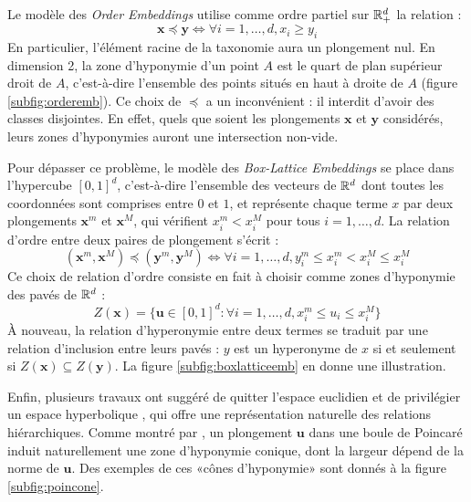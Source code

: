 Le modèle des \textit{Order Embeddings}\cite{vendrov2015order} utilise comme ordre partiel sur $\mathbb{R}^d_+$ la relation :
\begin{equation}
    \textbf{x} \preceq \textbf{y} \iff \forall i = 1, \ldots, d, {} x_i \geq y_i
\end{equation}
En particulier, l'élément racine de la taxonomie aura un plongement nul. %
En dimension 2, la zone d'hyponymie d'un point $A$ est le quart de plan supérieur droit de $A$, c'est-à-dire l'ensemble des points situés en haut à droite de $A$ (figure \ref{subfig:orderemb}). Ce choix de $\preceq$ a un inconvénient : il interdit d'avoir des classes disjointes. En effet, quels que soient les plongements $\textbf{x}$ et $\textbf{y}$ considérés, leurs zones d'hyponymies auront une intersection non-vide.

Pour dépasser ce problème, le modèle des \textit{Box-Lattice Embeddings} \cite{vilnis2018probabilistic} se place dans l'hypercube $[0, 1]^d$, c'est-à-dire l'ensemble des vecteurs de $\mathbb{R}^d$ dont toutes les coordonnées sont comprises entre $0$ et $1$, et représente chaque terme $x$ par deux plongements $\textbf{x}^m$ et $\textbf{x}^M$, qui vérifient $x_i^m < x_i^M$ pour tous $i = 1, \ldots, d$. La relation d'ordre entre deux paires de plongement s'écrit :
\begin{equation}
    (\textbf{x}^m, \textbf{x}^M) \preceq (\textbf{y}^m, \textbf{y}^M) \iff \forall i = 1, \ldots, d, {} y_i^m \leq x_i^m < x_i^M \leq x_i^M
\end{equation}
Ce choix de relation d'ordre consiste en fait à choisir comme zones d'hyponymie des pavés de $\mathbb{R}^d$ :
\begin{equation}
    Z(\textbf{x}) = \{ \textbf{u} \in [0, 1]^d : \forall i=1, \ldots, d, {} x_i^m \leq u_i \leq x_i^M \}
\end{equation}
À nouveau, la relation d'hyperonymie entre deux termes se traduit par une relation d'inclusion entre leurs pavés : $y$ est un hyperonyme de $x$ si et seulement si $Z(\textbf{x}) \subseteq Z(\textbf{y})$. La figure \ref{subfig:boxlatticeemb} en donne une illustration.

Enfin, plusieurs travaux ont suggéré de quitter l'espace euclidien et de privilégier un espace hyperbolique \cite{nickel2017poincare, nickel2018learning, Aly_2019, dhingra2018embedding, ganea2018hyperbolic}, qui offre une représentation naturelle des relations hiérarchiques. Comme montré par \cite{ganea2018hyperbolic}, un plongement $\textbf{u}$ dans une boule de Poincaré induit naturellement une zone d'hyponymie conique, dont la largeur dépend de la norme de $\textbf{u}$. Des exemples de ces «cônes d'hyponymie» sont donnés à la figure \ref{subfig:poincone}.



